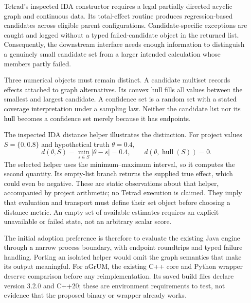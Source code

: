 Tetrad's inspected IDA constructor requires a legal partially directed acyclic
graph and continuous data. Its total-effect routine produces regression-based
candidates across eligible parent configurations. Candidate-specific exceptions
are caught and logged without a typed failed-candidate object in the returned
list. Consequently, the downstream interface needs enough information to
distinguish a genuinely small candidate set from a larger intended calculation
whose members partly failed. \citep{v12_sw_tetrad}

Three numerical objects must remain distinct. A candidate multiset records
effects attached to graph alternatives. Its convex hull fills all values
between the smallest and largest candidate. A confidence set is a random set
with a stated coverage interpretation under a sampling law. Neither the
candidate list nor its hull becomes a confidence set merely because it has
endpoints.

The inspected IDA distance helper illustrates the distinction. For project
values \(S=\{0,0.8\}\) and hypothetical truth \(\theta=0.4\),
\[
 d(\theta,S)=\min_{s\in S}|\theta-s|=0.4,
 \qquad d(\theta,\operatorname{hull}(S))=0.
\]
The selected helper uses the minimum--maximum interval, so it computes the
second quantity. Its empty-list branch returns the supplied true effect, which
could even be negative. These are static observations about that helper,
accompanied by project arithmetic; no Tetrad execution is claimed. They imply
that evaluation and transport must define their set object before choosing a
distance metric. An empty set of available estimates requires an explicit
unavailable or failed state, not an arbitrary scalar score. \citep{v12_sw_tetrad}

The initial adoption preference is therefore to evaluate the existing Java
engine through a narrow process boundary, with endpoint roundtrips and typed
failure handling. Porting an isolated helper would omit the graph semantics
that make its output meaningful. For aGrUM, the existing C++ core and Python
wrapper deserve comparison before any reimplementation. Its saved build files
declare version 3.2.0 and C++20; these are environment requirements to test,
not evidence that the proposed binary or wrapper already works.


